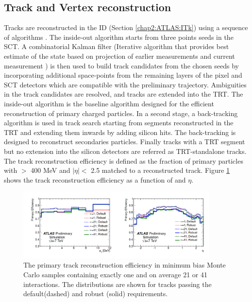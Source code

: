 \subsection{Track and Vertex reconstruction}
\label{chap2:Objects:Trk}
Tracks are reconstructed in the ID (Section \ref{chap2:ATLAS:ITk}) using a sequence of algorithms \cite{Track_Reco, New_Trk}. The inside-out algorithm starts from three points seeds in the SCT.  A combinatorial Kalman filter (Iterative algorithm that provides best estimate of the state based on projection of earlier measurements and current measurement \cite{Kalman} ) is then used to build track candidates from the chosen seeds by incorporating additional space-points from the remaining layers of the pixel and SCT detectors which are compatible with the preliminary trajectory. Ambiguities in the track candidates are resolved, and tracks are extended into the TRT. The inside-out algorithm is the baseline algorithm designed for the efficient reconstruction of primary charged particles. In a second stage, a back-tracking algorithm is used in track search starting from segments reconstructed in the TRT and extending them inwards by adding silicon hits. The back-tracking is designed to reconstruct secondaries particles. Finally tracks with a TRT segment but no extension into the silicon detectors are referred as TRT-standalone tracks. The track reconstruction efficiency is defined as the fraction of primary particles with \pT $>$ 400 MeV and $|\eta|<$ 2.5 matched to a reconstructed track. Figure \ref{fig:chap2:Objects:Trk:Eff} shows the track reconstruction efficiency as a function of \pT and $\eta$.
\begin{figure}[ht]
    \centering
    \includegraphics[width=0.9\textwidth]{Ch2/Img/Track_reco_eff.png}
    \caption{The primary track reconstruction efficiency in minimum bias Monte Carlo samples containing exactly one and on average 21 or 41 interactions. The distributions are shown for tracks passing the default(dashed) and robust (solid) requirements.}
    \label{fig:chap2:Objects:Trk:Eff}
\end{figure}
